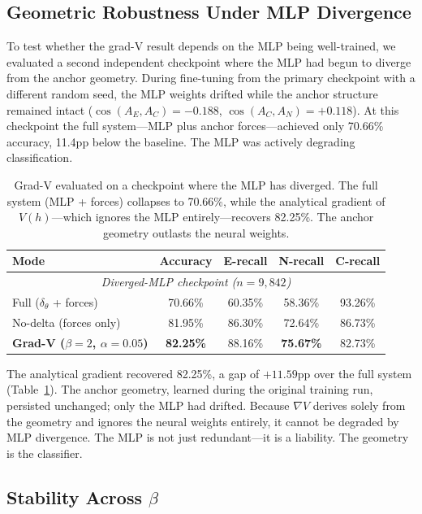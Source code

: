 \documentclass[11pt]{article}
\begin{document}
\subsection{Geometric Robustness Under MLP Divergence}

To test whether the grad-V result depends on the MLP being well-trained,
we evaluated a second independent checkpoint where the MLP had begun to
diverge from the anchor geometry. During fine-tuning from the primary
checkpoint with a different random seed, the MLP weights drifted while
the anchor structure remained intact ($\cos(A_E, A_C) = -0.188$,
$\cos(A_C, A_N) = +0.118$). At this checkpoint the full system---MLP
plus anchor forces---achieved only 70.66\% accuracy, 11.4pp below
the baseline. The MLP was actively degrading classification.

\begin{table}[ht]
\centering
\begin{tabular}{@{}lcccc@{}}
\toprule
Mode & Accuracy & E-recall & N-recall & C-recall \\
\midrule
\multicolumn{5}{c}{\textit{Diverged-MLP checkpoint ($n=9{,}842$)}} \\
\midrule
Full ($\delta_\theta$ + forces) & 70.66\% & 60.35\% & 58.36\% & 93.26\% \\
No-delta (forces only) & 81.95\% & 86.30\% & 72.64\% & 86.73\% \\
\textbf{Grad-V ($\beta=2$, $\alpha=0.05$)} & \textbf{82.25\%} & 88.16\% & \textbf{75.67\%} & 82.73\% \\
\bottomrule
\end{tabular}
\caption{Grad-V evaluated on a checkpoint where the MLP has diverged.
The full system (MLP + forces) collapses to 70.66\%, while the
analytical gradient of $V(h)$---which ignores the MLP entirely---recovers
82.25\%. The anchor geometry outlasts the neural weights.}
\label{tab:robustness}
\end{table}

The analytical gradient recovered 82.25\%, a gap of $+11.59$pp over the
full system (Table~\ref{tab:robustness}). The anchor geometry, learned
during the original training run, persisted unchanged; only the MLP
had drifted. Because $\nabla V$ derives solely from the geometry and
ignores the neural weights entirely, it cannot be degraded by MLP
divergence. The MLP is not just redundant---it is a liability. The
geometry is the classifier.

\subsection{Stability Across \texorpdfstring{$\beta$}{beta}}
\end{document}
